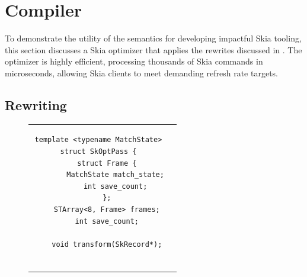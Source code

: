 \documentclass[main.tex]{subfiles}
\begin{document}
\section{Compiler}
\label{sec:compiler}

To demonstrate the utility of the \muskia semantics
  for developing impactful Skia tooling,
  this section discusses a Skia optimizer
  that applies the rewrites discussed in .
The optimizer is highly efficient,
  processing thousands of Skia commands in microseconds,
  allowing Skia clients to meet demanding refresh rate targets.

\subsection{Rewriting}

\begin{figure}[h]
  \footnotesize
  \begin{tabular}{@{}cc@{}}
    \begin{minipage}[t]{0.42\linewidth}
      \vspace{0pt}
      \begin{BVerbatim}[baselinestretch=1.1,fontsize=\scriptsize]
template <typename MatchState>
struct SkOptPass {
    struct Frame {
        MatchState match_state;
        int save_count;
    };
    STArray<8, Frame> frames;
    int save_count;

    void transform(SkRecord*);


\end{BVerbatim}
\end{minipage}
\end{tabular}
\end{figure}
\end{document}
